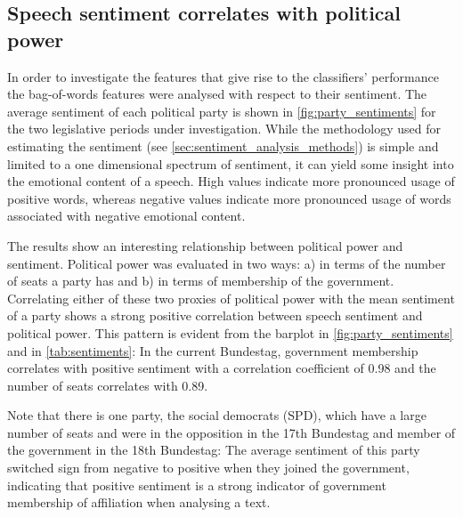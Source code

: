 \documentclass[runningheads,a4paper]{llncs}
\begin{document}
\subsection{Speech sentiment correlates with political power}\label{sec:sentiment_result}
In order to investigate the features that give rise to the classifiers' performance the bag-of-words features were analysed with respect to their sentiment. The average sentiment of each political party is shown in \autoref{fig:party_sentiments} for the two legislative periods under investigation. While the methodology used for estimating the sentiment (see \autoref{sec:sentiment_analysis_methods}) is simple and limited to a one dimensional spectrum of sentiment, it can yield some insight into the emotional content of a speech. High values indicate more pronounced usage of positive words, whereas negative values indicate more pronounced usage of words associated with negative emotional content. 

The results show an interesting relationship between political power and sentiment. Political power was evaluated in two ways: a) in terms of the number of seats a party has and b) in terms of membership of the government. Correlating either of these two proxies of political power with the mean sentiment of a party shows a strong positive correlation between speech sentiment and political power. This pattern is evident from the barplot in \autoref{fig:party_sentiments} and in \autoref{tab:sentiments}: In the current Bundestag, government membership correlates with positive sentiment with a correlation coefficient of 0.98 and the number of seats correlates with 0.89. 

Note that there is one party, the social democrats (SPD), which have a large number of seats and were in the opposition in the 17th Bundestag and member of the government in the 18th Bundestag: The average sentiment of this party switched sign from negative to positive when they joined the government, indicating that positive sentiment is a strong indicator of government membership of affiliation when analysing a text. 
\end{document}
